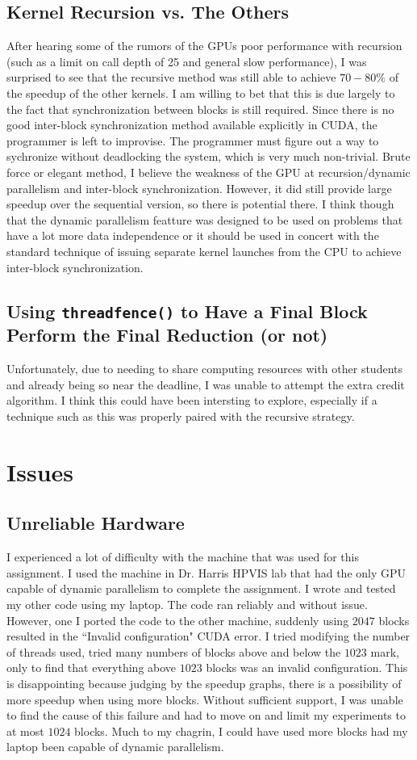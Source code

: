 \documentclass{article}
\begin{document}
\subsection{Kernel Recursion vs. The Others}
After hearing some of the rumors of the GPUs poor performance with recursion (such as a limit on call depth of 25 and general slow performance), I was surprised to see that the recursive method was still able to achieve $70-80\%$ of the speedup of the other kernels. I am willing to bet that this is due largely to the fact that synchronization between blocks is still required. Since there is no good inter-block synchronization method available explicitly in CUDA, the programmer is left to improvise. The programmer must figure out a way to sychronize without deadlocking the system, which is very much non-trivial. Brute force or elegant method, I believe the weakness of the GPU at recursion/dynamic parallelism and inter-block synchronization. However, it did still provide large speedup over the sequential version, so there is potential there. I think though that the dynamic parallelism featture was designed to be used on problems that have a lot more data independence or it should be used in concert with the standard technique of issuing separate kernel launches from the CPU to achieve inter-block synchronization.

\subsection{Using \texttt{threadfence()} to Have a Final Block Perform the Final Reduction (or not)}
Unfortunately, due to needing to share computing resources with other students and already being so near the deadline, I was unable to attempt the extra credit algorithm. I think this could have been intersting to explore, especially if a technique such as this was properly paired with the recursive strategy.

\section{Issues}
\subsection{Unreliable Hardware}
I experienced a lot of difficulty with the machine that was used for this assignment. I used the machine in Dr. Harris HPVIS lab that had the only GPU capable of dynamic parallelism to complete the assignment. I wrote and tested my other code using my laptop. The code ran reliably and without issue. However, one I ported the code to the other machine, suddenly using $2047$ blocks resulted in the ``Invalid configuration" CUDA error. I tried modifying the number of threads used, tried many numbers of blocks above and below the $1023$ mark, only to find that everything above $1023$ blocks was an invalid configuration. This is disappointing because judging by the speedup graphs, there is a possibility of more speedup when using more blocks. Without sufficient support, I was unable to find the cause of this failure and had to move on and limit my experiments to at most $1024$ blocks. Much to my chagrin, I could have used more blocks had my laptop been capable of dynamic parallelism.
\end{document}

